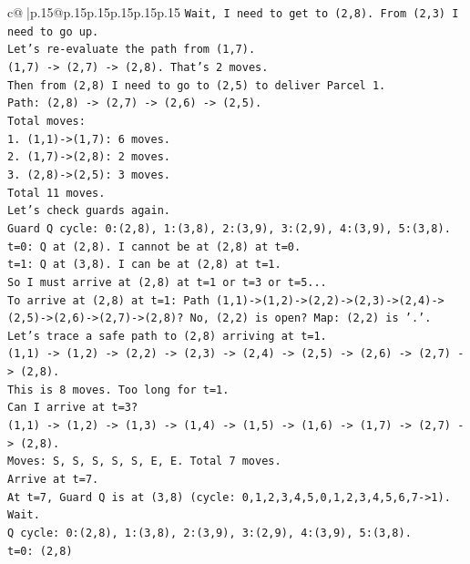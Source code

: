 \documentclass{article}
\begin{document}
{\begin{supertabular}{c@{$\;$}|p{.15\linewidth}@{}p{.15\linewidth}p{.15\linewidth}p{.15\linewidth}p{.15\linewidth}p{.15\linewidth}}
{{{\texttt{Wait, I need to get to (2,8). From (2,3) I need to go up.} \\
\texttt{Let's re{-}evaluate the path from (1,7).} \\
\texttt{(1,7) {-}> (2,7) {-}> (2,8). That's 2 moves.} \\
\texttt{Then from (2,8) I need to go to (2,5) to deliver Parcel 1.} \\
\texttt{Path: (2,8) {-}> (2,7) {-}> (2,6) {-}> (2,5).} \\
\texttt{Total moves:} \\
\texttt{1. (1,1){-}>(1,7): 6 moves.} \\
\texttt{2. (1,7){-}>(2,8): 2 moves.} \\
\texttt{3. (2,8){-}>(2,5): 3 moves.} \\
\texttt{Total 11 moves.} \\
\texttt{Let's check guards again.} \\
\texttt{Guard Q cycle: 0:(2,8), 1:(3,8), 2:(3,9), 3:(2,9), 4:(3,9), 5:(3,8).} \\
\texttt{t=0: Q at (2,8). I cannot be at (2,8) at t=0.} \\
\texttt{t=1: Q at (3,8). I can be at (2,8) at t=1.} \\
\texttt{So I must arrive at (2,8) at t=1 or t=3 or t=5...} \\
\texttt{To arrive at (2,8) at t=1: Path (1,1){-}>(1,2){-}>(2,2){-}>(2,3){-}>(2,4){-}>(2,5){-}>(2,6){-}>(2,7){-}>(2,8)? No, (2,2) is open? Map: (2,2) is '.'.} \\
\texttt{Let's trace a safe path to (2,8) arriving at t=1.} \\
\texttt{(1,1) {-}> (1,2) {-}> (2,2) {-}> (2,3) {-}> (2,4) {-}> (2,5) {-}> (2,6) {-}> (2,7) {-}> (2,8).} \\
\texttt{This is 8 moves. Too long for t=1.} \\
\texttt{Can I arrive at t=3?} \\
\texttt{(1,1) {-}> (1,2) {-}> (1,3) {-}> (1,4) {-}> (1,5) {-}> (1,6) {-}> (1,7) {-}> (2,7) {-}> (2,8).} \\
\texttt{Moves: S, S, S, S, S, E, E. Total 7 moves.} \\
\texttt{Arrive at t=7.} \\
\texttt{At t=7, Guard Q is at (3,8) (cycle: 0,1,2,3,4,5,0,1,2,3,4,5,6,7{-}>1). Wait.} \\
\texttt{Q cycle: 0:(2,8), 1:(3,8), 2:(3,9), 3:(2,9), 4:(3,9), 5:(3,8).} \\
\texttt{t=0: (2,8)} \\
}}}
\end{supertabular}}
\end{document}
